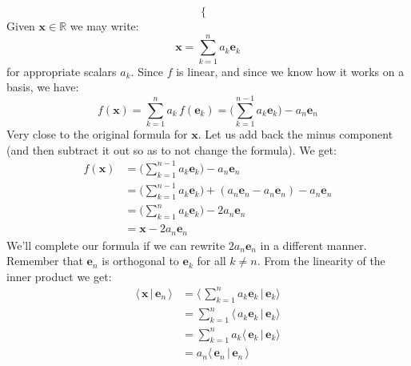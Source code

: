 \documentclass{article}
\theoremstyle{normal}
\newenvironment{example}{%
    \pushQED{\qed}\renewcommand{\qedsymbol}{$\blacksquare$}\examplex%
}{%
    \popQED\endexamplex%
}
\begin{document}
\begin{example}[\textbf{Reflections}]
\begin{equation}
\begin{cases}
            \end{cases}
        \end{equation}
        Given $\mathbf{x}\in\mathbb{R}$ we may write:
        \begin{equation}
            \mathbf{x}=\sum_{k=1}^{n}a_{k}\mathbf{e}_{k}
        \end{equation}
        for appropriate scalars $a_{k}$. Since $f$ is linear, and since we know
        how it works on a basis, we have:
        \begin{equation}
            f(\mathbf{x})=\sum_{k=1}^{n}a_{k}\,f(\mathbf{e}_{k})
            =\Big(\sum_{k=1}^{n-1}a_{k}\mathbf{e}_{k}\Big)-a_{n}\mathbf{e}_{n}
        \end{equation}
        Very close to the original formula for $\mathbf{x}$. Let us add back
        the minus component (and then subtract it out so as to not change the
        formula). We get:
        \begin{align}
            f(\mathbf{x})
            &=\Big(
                \sum_{k=1}^{n-1}a_{k}\mathbf{e}_{k}
            \Big)-a_{n}\mathbf{e}_{n}\\
            &=\Big(
                \sum_{k=1}^{n-1}a_{k}\mathbf{e}_{k}
            \Big)+(a_{n}\mathbf{e}_{n}-a_{n}\mathbf{e}_{n})
            -a_{n}\mathbf{e}_{n}\\
            &=\Big(
                \sum_{k=1}^{n}a_{k}\mathbf{e}_{k}
            \Big)-2a_{n}\mathbf{e}_{n}\\
            &=\mathbf{x}-2a_{n}\mathbf{e}_{n}
        \end{align}
        We'll complete our formula if we can rewrite $2a_{n}\mathbf{e}_{n}$ in
        a different manner. Remember that $\mathbf{e}_{n}$ is
        orthogonal to $\mathbf{e}_{k}$ for all $k\ne{n}$. From the linearity of
        the inner product we get:
        \begin{align}
            \langle\,\mathbf{x}\,|\,\mathbf{e}_{n}\,\rangle
            &=
            \langle\,
                \sum_{k=1}^{n}a_{k}\mathbf{e}_{k}\,|\,\mathbf{e}_{k}
            \rangle\\
            &=
            \sum_{k=1}^{n}\langle\,
                a_{k}\mathbf{e}_{k}\,|\,\mathbf{e}_{k}
            \rangle\\
            &=\sum_{k=1}^{n}a_{k}\langle\,
                \mathbf{e}_{k}\,|\,\mathbf{e}_{k}
            \rangle\\
            &=a_{n}\langle\,\mathbf{e}_{n}\,|\,\mathbf{e}_{n}\,\rangle
        \end{align}

\end{example}
\end{document}
